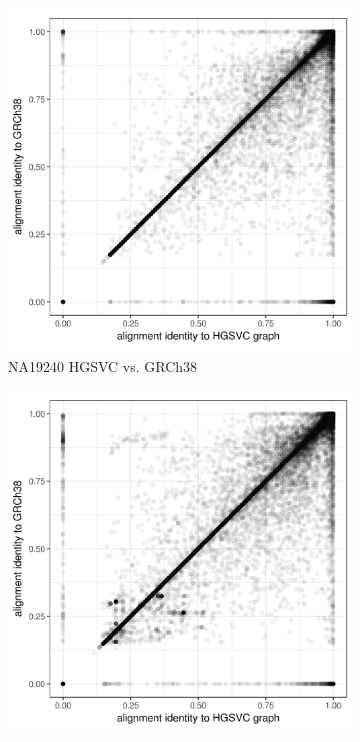 \begin{figure}[htbp!] 
  \centering
  \begin{subfigure}[t]{0.49\textwidth}
    \includegraphics[width=1.0\textwidth]{Chapter3/Figs/NA19240_hg38_vs_HGSVC_scatter.png}
    \caption{NA19240 HGSVC vs. GRCh38}
    \label{subfig:hgsvc_NA19240_scatter}
  \end{subfigure}
  \begin{subfigure}[t]{0.49\textwidth}
    \includegraphics[width=1.0\textwidth]{Chapter3/Figs/NA24385_hg38_vs_HGSVC_scatter.png}

\end{subfigure}
\end{figure}
